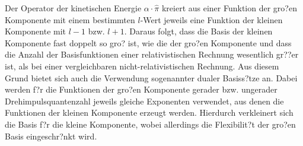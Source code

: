 Der Operator der kinetischen Energie $\alpha\cdot\hat{\pi}$ kreiert aus einer Funktion der gro?en Komponente mit einem bestimmten $l$-Wert jeweils eine Funktion der kleinen Komponente mit $l-1$ bzw. $l+1$. Daraus folgt, dass die Basis der kleinen Komponente fast doppelt so gro? ist, wie die der gro?en Komponente und dass die Anzahl der Basisfunktionen einer relativistischen Rechnung wesentlich gr??er ist, als bei einer vergleichbaren nicht-relativistischen Rechnung. Aus diesem Grund bietet sich auch die Verwendung sogenannter dualer Basiss?tze an. Dabei werden f?r die Funktionen der gro?en Komponente gerader bzw. ungerader Drehimpulsquantenzahl jeweils gleiche Exponenten verwendet, aus denen die Funktionen der kleinen Komponente erzeugt werden. Hierdurch verkleinert sich die Basis f?r die kleine Komponente, wobei allerdings die Flexibilit?t der gro?en Basis eingeschr?nkt wird.

